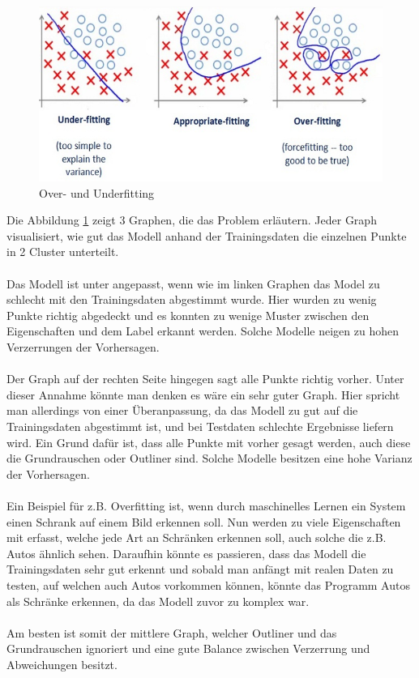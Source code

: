 \documentclass[12pt,oneside,a4paper,parskip]{scrbook}
\begin{document}
\begin{figure}[h]
	\begin{center}
		\includegraphics[width=15cm]{Bilder/overUnderfitting.png}
		\caption{Over- und Underfitting}
		\label{fig:overUnderFitting}
	\end{center}
\end{figure}

Die Abbildung \ref{fig:overUnderFitting} zeigt 3 Graphen, die das Problem erläutern. Jeder Graph visualisiert, wie gut das Modell anhand der Trainingsdaten die einzelnen Punkte in 2 Cluster unterteilt.
\\\\
Das Modell ist unter angepasst, wenn wie im linken Graphen das Model zu schlecht mit den Trainingsdaten abgestimmt wurde. Hier wurden zu wenig Punkte richtig abgedeckt und es konnten zu wenige Muster zwischen den Eigenschaften und dem Label erkannt werden. Solche Modelle neigen zu hohen Verzerrungen der Vorhersagen.
\\\\
Der Graph auf der rechten Seite hingegen sagt alle Punkte richtig vorher. Unter dieser Annahme könnte man denken es wäre ein sehr guter Graph. Hier spricht man allerdings von einer Überanpassung, da das Modell zu gut auf die Trainingsdaten abgestimmt ist, und bei Testdaten schlechte Ergebnisse liefern wird. Ein Grund dafür ist, dass alle Punkte mit vorher gesagt werden, auch diese die Grundrauschen oder Outliner sind. Solche Modelle besitzen eine hohe Varianz der Vorhersagen\cite{overUnderfitting}.
\\\\

Ein Beispiel für z.B. Overfitting ist, wenn durch maschinelles Lernen ein System einen Schrank auf einem Bild erkennen soll. Nun werden zu viele Eigenschaften mit erfasst, welche jede Art an Schränken erkennen soll, auch solche die z.B. Autos ähnlich sehen. Daraufhin könnte es passieren, dass das Modell die Trainingsdaten sehr gut erkennt und sobald man anfängt mit realen Daten zu testen, auf welchen auch Autos vorkommen können, könnte das Programm Autos als Schränke erkennen, da das Modell zuvor zu komplex war.
\\\\
Am besten ist somit der mittlere Graph, welcher Outliner und das Grundrauschen ignoriert und eine gute Balance zwischen Verzerrung und Abweichungen besitzt.
\end{document}
